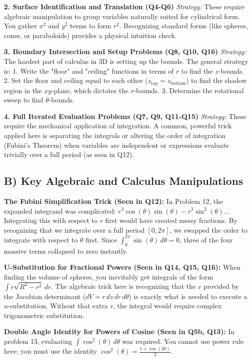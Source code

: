 \documentclass[11pt]{article}
\begin{document}
\textbf{2. Surface Identification and Translation (Q4-Q6)}
\textit{Strategy:} These require algebraic manipulation to group variables naturally suited for cylindrical form. You gather $x^2$ and $y^2$ terms to form $r^2$. Recognizing standard forms (like spheres, cones, or paraboloids) provides a physical intuition check.

\textbf{3. Boundary Intersection and Setup Problems (Q8, Q10, Q16)}
\textit{Strategy:} The hardest part of calculus in 3D is setting up the bounds. The general strategy is:
1. Write the "floor" and "ceiling" functions in terms of $r$ to find the $z$-bounds.
2. Set the floor and ceiling equal to each other ($z_{\text{top}} = z_{\text{bottom}}$) to find the shadow region in the $xy$-plane, which dictates the $r$-bounds.
3. Determine the rotational sweep to find $\theta$-bounds.

\textbf{4. Full Iterated Evaluation Problems (Q7, Q9, Q11-Q15)}
\textit{Strategy:} These require the mechanical application of integration. A common, powerful trick applied here is separating the integrals or altering the order of integration (Fubini's Theorem) when variables are independent or expressions evaluate trivially over a full period (as seen in Q12).

\subsection{B) Key Algebraic and Calculus Manipulations}

\textbf{The Fubini Simplification Trick (Seen in Q12):}
In Problem 12, the expanded integrand was complicated: $r^3\cos(\theta)\sin(\theta) - r^3\sin^2(\theta) \dots$ Integrating this with respect to $r$ first would have created messy fractions. By recognizing that we integrate over a full period $[0, 2\pi]$, we swapped the order to integrate with respect to $\theta$ first. Since $\int_0^{2\pi} \sin(\theta) \, d\theta = 0$, three of the four massive terms collapsed to zero instantly.

\textbf{U-Substitution for Fractional Powers (Seen in Q14, Q15, Q16):}
When finding the volume of spheres, you inevitably get integrals of the form $\int r\sqrt{R^2 - r^2} \, dr$. The algebraic trick here is recognizing that the $r$ provided by the Jacobian determinant ($dV = r \, dz \, dr \, d\theta$) is exactly what is needed to execute a $u$-substitution. Without that extra $r$, the integral would require complex trigonometric substitution.

\textbf{Double Angle Identity for Powers of Cosine (Seen in Q5b, Q13):}
In problem 13, evaluating $\int \cos^2(\theta) \, d\theta$ was required. You cannot use power rule here; you must use the identity $\cos^2(\theta) = \frac{1 + \cos(2\theta)}{2}$.
\end{document}
